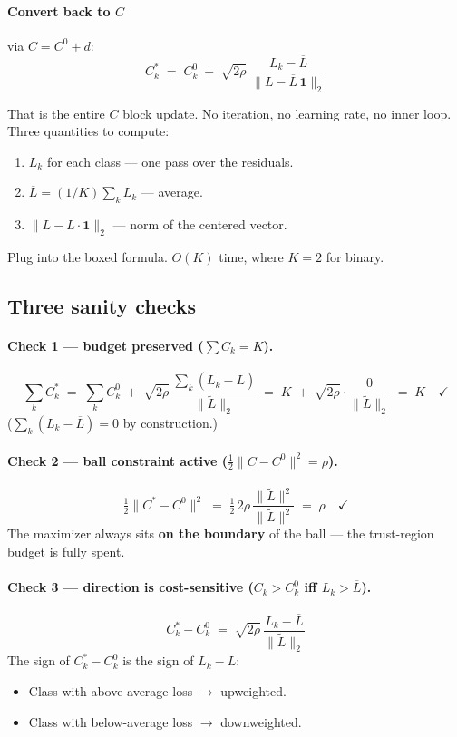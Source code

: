 \documentclass[11pt,a4paper]{article}
\begin{document}
\paragraph{Convert back to $C$} via $C = C^0 + d$:
\begin{equation}
\boxed{\;C_k^{*} \;=\; C_k^{0} \;+\; \sqrt{2\rho}\;\frac{L_k - \overline{L}}{\|L - \overline{L}\,\mathbf{1}\|_{2}}\;}
\end{equation}

That is the entire $C$ block update. No iteration, no learning rate, no inner loop. Three quantities to compute:
\begin{enumerate}[leftmargin=*,itemsep=2pt]
  \item $L_k$ for each class --- one pass over the residuals.
  \item $\overline{L} = (1/K) \sum_k L_k$ --- average.
  \item $\|L - \overline{L} \cdot \mathbf{1}\|_2$ --- norm of the centered vector.
\end{enumerate}

Plug into the boxed formula. $O(K)$ time, where $K = 2$ for binary.

\subsection{Three sanity checks}

\paragraph{Check 1 --- budget preserved ($\sum C_k = K$).}
\[
\sum_{k} C_k^{*} \;=\; \sum_{k} C_k^{0} \;+\; \sqrt{2\rho}\,\frac{\sum_{k}(L_k - \overline{L})}{\|\widetilde{L}\|_{2}} \;=\; K \;+\; \sqrt{2\rho}\cdot\frac{0}{\|\widetilde{L}\|_{2}} \;=\; K \quad \checkmark
\]
($\sum_k (L_k - \overline{L}) = 0$ by construction.)

\paragraph{Check 2 --- ball constraint active ($\frac{1}{2}\|C - C^0\|^2 = \rho$).}
\[
\tfrac{1}{2}\|C^{*} - C^{0}\|^{2} \;=\; \tfrac{1}{2}\,2\rho\,\frac{\|\widetilde{L}\|^{2}}{\|\widetilde{L}\|^{2}} \;=\; \rho \quad \checkmark
\]
The maximizer always sits \textbf{on the boundary} of the ball --- the trust-region budget is fully spent.

\paragraph{Check 3 --- direction is cost-sensitive ($C_k > C_k^0$ iff $L_k > \overline{L}$).}
\[
C_k^{*} - C_k^{0} \;=\; \sqrt{2\rho}\,\frac{L_k - \overline{L}}{\|\widetilde{L}\|_{2}}
\]
The sign of $C_k^* - C_k^0$ is the sign of $L_k - \overline{L}$:
\begin{itemize}[leftmargin=*,itemsep=2pt]
  \item Class with above-average loss $\to$ upweighted.
  \item Class with below-average loss $\to$ downweighted.
\end{itemize}
\end{document}
